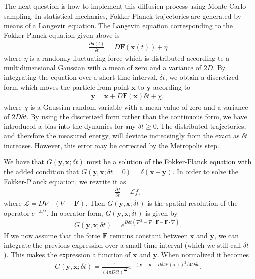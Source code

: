 \documentclass[twoside,english]{uiofysmaster}
\begin{document}
The next question is how to implement this diffusion process using Monte Carlo sampling.
In statistical
mechanics, Fokker-Planck trajectories are generated by means of a
Langevin equation. The Langevin equation corresponding to the
Fokker-Planck equation given above is \cite{Hammond1994}
\begin{align}
	\frac{\partial \bm{x} (t)}{\partial t} = D \bm{F} (\bm{x}(t)) + \eta
\end{align}
where $\eta$ is a randomly fluctuating force which is distributed
according to a multidimensional Gaussian with a mean of zero and a
variance of $2D$. By integrating the equation over
a short time interval, $\delta t$, we obtain a discretized form which moves the particle from
point $\bm{x}$ to $\bm{y}$ according to
\begin{align}
	\bm{y} = \bm{x} + D \bm{F} (\bm{x}) \delta t + \chi,
\end{align}
where $\chi$ is a Gaussian random variable with a mean
value of zero and a variance of $2D \delta t$. By using the
discretized form rather than the continuous form, we have introduced a
bias into the dynamics for any $\delta t \geq 0$. The distributed
trajectories, and therefore the measured energy, will deviate
increasingly from the exact as $\delta t$ increases. However, this
error may be corrected by the Metropolis step.

We have that $G(\bm{y}, \bm{x}; \delta t)$ must be a solution of the
Fokker-Planck equation with the added condition that $G(\bm{y},
\bm{x}; \delta t = 0) = \delta (\bm{x} - \bm{y})$. In order to solve the
Fokker-Planck equation, we rewrite it as
\begin{align}
	\frac{\partial f}{\partial t} = \mathcal{L} f,
\end{align}
where $\mathcal{L} = D \nabla \cdot (\nabla - \bm{F})$. Then
$G(\bm{y}, \bm{x}; \delta t)$ is the spatial resolution of the
operator $e^{-\mathcal{L} \delta t}$. In operator form, $G(\bm{y},
\bm{x}; \delta t)$ is given by
\begin{align}
	G(\bm{y}, \bm{x}; \delta t)  = e^{ D \delta t ( \nabla^2 - \nabla \cdot \bm{F} - \bm{F} \cdot \nabla ) }.
\end{align}
If we now assume that the force $\bm{F}$ remains constant
between $\bm{x}$ and $\bm{y}$, we can integrate the previous
expression over a small time interval (which we still call
$\delta t$). This makes the expression a function of $\bm{x}$ and
$\bm{y}$. When normalized it becomes
\begin{align}
	G(\bm{y}, \bm{x}; \delta t) = \frac{1}{(4 \pi D \delta t)^{\frac{3N}{2}}} e^{ - ( \bm{y} - \bm{x} - D\delta t \bm{F}(\bm{x}) )^2 / 4D \delta t }.
\end{align}
\end{document}

